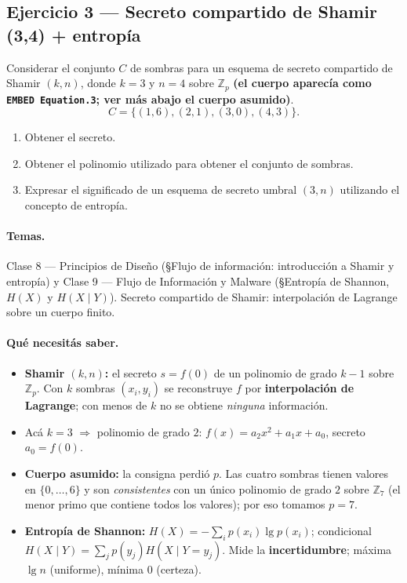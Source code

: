 \subsection{Ejercicio 3 — Secreto compartido de Shamir (3,4) + entropía}

\begin{consigna}
Considerar el conjunto $C$ de sombras para un esquema de secreto compartido de Shamir $(k,n)$, donde $k=3$ y $n=4$ sobre $\mathbb{Z}_p$ \textbf{(el cuerpo aparecía como \texttt{EMBED Equation.3}; ver más abajo el cuerpo asumido)}.
\[
  C = \{(1,6),(2,1),(3,0),(4,3)\}.
\]
\begin{enumerate}
  \item Obtener el secreto.
  \item Obtener el polinomio utilizado para obtener el conjunto de sombras.
  \item Expresar el significado de un esquema de secreto umbral $(3,n)$ utilizando el concepto de entropía.
\end{enumerate}
\end{consigna}

\paragraph{Temas.}
Clase 8 — Principios de Diseño (\S Flujo de información: introducción a Shamir y entropía) y Clase 9 — Flujo de Información y Malware (\S Entropía de Shannon, $H(X)$ y $H(X\mid Y)$). Secreto compartido de Shamir: interpolación de Lagrange sobre un cuerpo finito.

\paragraph{Qué necesitás saber.}
\begin{itemize}
  \item \textbf{Shamir $(k,n)$:} el secreto $s=f(0)$ de un polinomio de grado $k-1$ sobre $\mathbb{Z}_p$. Con $k$ sombras $(x_i,y_i)$ se reconstruye $f$ por \textbf{interpolación de Lagrange}; con menos de $k$ no se obtiene \emph{ninguna} información.
  \item Acá $k=3$ $\Rightarrow$ polinomio de grado $2$: $f(x)=a_2x^2+a_1x+a_0$, secreto $a_0=f(0)$.
  \item \textbf{Cuerpo asumido:} la consigna perdió $p$. Las cuatro sombras tienen valores en $\{0,\dots,6\}$ y son \emph{consistentes} con un único polinomio de grado $2$ sobre $\mathbb{Z}_7$ (el menor primo que contiene todos los valores); por eso tomamos $\boxed{p=7}$.
  \item \textbf{Entropía de Shannon:} $H(X)=-\sum_i p(x_i)\lg p(x_i)$; condicional $H(X\mid Y)=\sum_j p(y_j)H(X\mid Y=y_j)$. Mide la \textbf{incertidumbre}; máxima $\lg n$ (uniforme), mínima $0$ (certeza).
\end{itemize}

